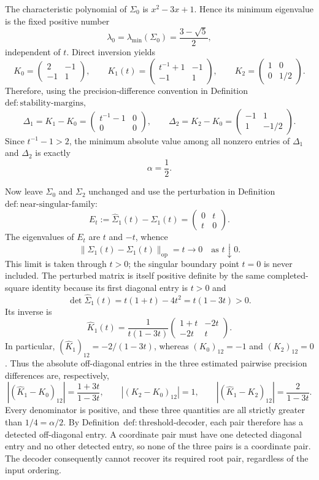 The characteristic polynomial of \(\Sigma_0\) is \(x^2-3x+1\).  Hence its minimum eigenvalue is the fixed positive number
\[
 \lambda_{0}=\lambda_{\min}(\Sigma_0)=\frac{3-\sqrt5}{2},
\]
independent of \(t\).  Direct inversion yields
\[
 K_0=\begin{pmatrix}2&-1\\-1&1\end{pmatrix},\qquad
 K_1(t)=\begin{pmatrix}t^{-1}+1&-1\\-1&1\end{pmatrix},\qquad
 K_2=\begin{pmatrix}1&0\\0&1/2\end{pmatrix}.
\]
Therefore, using the precision-difference convention in Definition~\(\mathrm{def:stability\text{-}margins}\),
\[
 \Delta_1=K_1-K_0=
 \begin{pmatrix}t^{-1}-1&0\\0&0\end{pmatrix},
 \qquad
 \Delta_2=K_2-K_0=
 \begin{pmatrix}-1&1\\1&-1/2\end{pmatrix}.
\]
Since \(t^{-1}-1>2\), the minimum absolute value among all nonzero entries of \(\Delta_1\) and \(\Delta_2\) is exactly
\[
 \alpha=\frac12.
\]

Now leave \(\Sigma_0\) and \(\Sigma_2\) unchanged and use the perturbation in Definition~\(\mathrm{def:near\text{-}singular\text{-}family}\):
\[
 E_t:=\widehat\Sigma_1(t)-\Sigma_1(t)
 =\begin{pmatrix}0&t\\t&0\end{pmatrix}.
\]
The eigenvalues of \(E_t\) are \(t\) and \(-t\), whence
\[
 \|\widehat\Sigma_1(t)-\Sigma_1(t)\|_{\mathrm{op}}=t\longrightarrow0
 \quad\text{as }t\downarrow0.
\]
This limit is taken through \(t>0\); the singular boundary point \(t=0\) is never included.  The perturbed matrix is itself positive definite by the same completed-square identity because its first diagonal entry is \(t>0\) and
\[
 \det\widehat\Sigma_1(t)=t(1+t)-4t^2=t(1-3t)>0.
\]
Its inverse is
\[
 \widehat K_1(t)
 =\frac1{t(1-3t)}
 \begin{pmatrix}1+t&-2t\\-2t&t\end{pmatrix}.
\]
In particular, \((\widehat K_1)_{12}=-2/(1-3t)\), whereas \((K_0)_{12}=-1\) and \((K_2)_{12}=0\).  Thus the absolute off-diagonal entries in the three estimated pairwise precision differences are, respectively,
\[
 \left| (\widehat K_1-K_0)_{12}\right|
   =\frac{1+3t}{1-3t},\qquad
 \left| (K_2-K_0)_{12}\right|=1,
 \qquad
 \left| (\widehat K_1-K_2)_{12}\right|
   =\frac2{1-3t}.
\]
Every denominator is positive, and these three quantities are all strictly greater than \(1/4=\alpha/2\).  By Definition~\(\mathrm{def:threshold\text{-}decoder}\), each pair therefore has a detected off-diagonal entry.  A coordinate pair must have one detected diagonal entry and no other detected entry, so none of the three pairs is a coordinate pair.  The decoder consequently cannot recover its required root pair, regardless of the input ordering.

